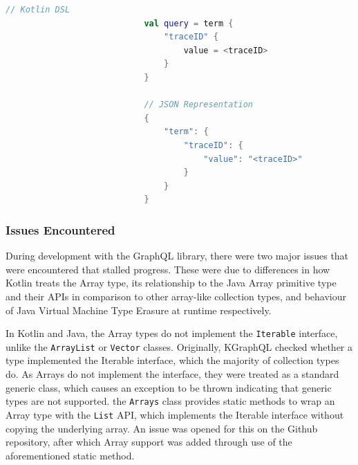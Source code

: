 \documentclass[12pt,pdftex,titlepage]{report}
\begin{document}
                    \newpage
                    \begin{spacing}{1.0}
                        \begin{lstlisting}[caption={Comparison between Elasticsearch query using Kotlin DSL and the query in its JSON representation, where $\langle$traceID$\rangle$ refers
                            to a variable storing the trace identifier.}, label={lst:eskotlin}, language=Kotlin, gobble=24]
                            // Kotlin DSL
                            val query = term { 
                                "traceID" {
                                    value = <traceID>
                                }
                            }

                            // JSON Representation
                            {
                                "term": {
                                    "traceID": { 
                                        "value": "<traceID>" 
                                    }
                                }
                            }
                        \end{lstlisting}
                    \end{spacing}

                \subsubsection{Issues Encountered}
                    During development with the GraphQL library, there were two major issues that were encountered that stalled progress. These were due to differences in how Kotlin treats the Array type, its
                    relationship to the Java Array primitive type and their APIs in comparison to other array-like collection types, and behaviour of Java Virtual Machine Type Erasure\cite{typeerasure} at runtime respectively.
                    
                    \smallskip
                    In Kotlin and Java, the Array types do not implement the \texttt{Iterable} interface, unlike the \texttt{ArrayList} or \texttt{Vector} classes. Originally, KGraphQL checked whether a type implemented the 
                    Iterable interface, which the majority of collection types do. As Arrays do not implement the interface, they were treated as a standard generic class, which causes an exception to be thrown indicating 
                    that generic types are not supported. the \texttt{Arrays} class provides static methods to wrap an Array type with the \texttt{List} API, which implements the Iterable interface without copying the 
                    underlying array. An issue was opened for this on the Github repository, after which Array support was added through use of the aforementioned static method.
\end{document}
